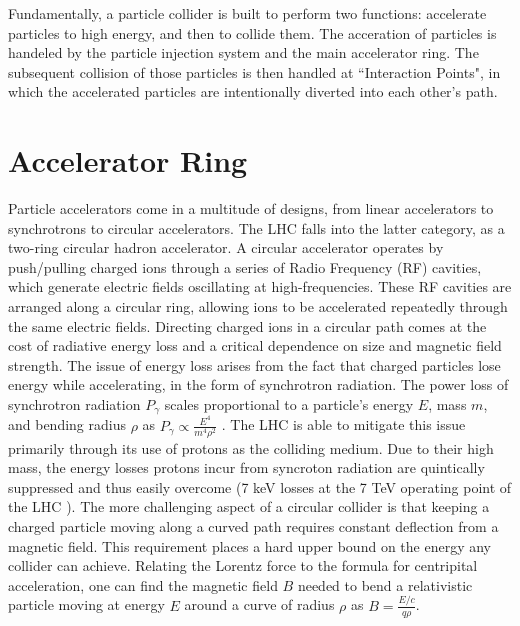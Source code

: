     Fundamentally, a particle collider is built to perform two functions: accelerate particles to high energy, and then to collide them.
    The acceration of particles is handeled by the particle injection system and the main accelerator ring.
    The subsequent collision of those particles is then handled at ``Interaction Points", in which the accelerated particles are intentionally diverted into each other's path.


\section{Accelerator Ring}
    Particle accelerators come in a multitude of designs, from linear accelerators to synchrotrons to circular accelerators.
    The LHC falls into the latter category, as a two-ring circular hadron accelerator.
    A circular accelerator operates by push/pulling charged ions through a series of Radio Frequency (RF) cavities, which generate electric fields oscillating at high-frequencies.
    These RF cavities are arranged along a circular ring, allowing ions to be accelerated repeatedly through the same electric fields.
    Directing charged ions in a circular path comes at the cost of radiative energy loss and a critical dependence on size and magnetic field strength.
    The issue of energy loss arises from the fact that charged particles lose energy while accelerating, in the form of synchrotron radiation.
    The power loss of synchrotron radiation $P_\gamma$ scales proportional to a particle's energy $E$, mass $m$, and bending radius $\rho$ as $P_\gamma \propto \frac{E^4}{m^4 \rho^2}$ \cite{2007_Book_ParticleAcceleratorPhysics}.
    The LHC is able to mitigate this issue primarily through its use of protons as the colliding medium.
    Due to their high mass, the energy losses protons incur from syncroton radiation are quintically suppressed and thus easily overcome (7 keV losses at the 7 TeV operating point of the LHC \cite{lhc_machine}). %
    The more challenging aspect of a circular collider is that keeping a charged particle moving along a curved path requires constant deflection from a magnetic field.
    This requirement places a hard upper bound on the energy any collider can achieve.
    Relating the Lorentz force to the formula for centripital acceleration, one can find the magnetic field $B$ needed to bend a relativistic particle moving at energy $E$ around a curve of radius $\rho$ as $B=\frac{E/c}{q \rho}$.
